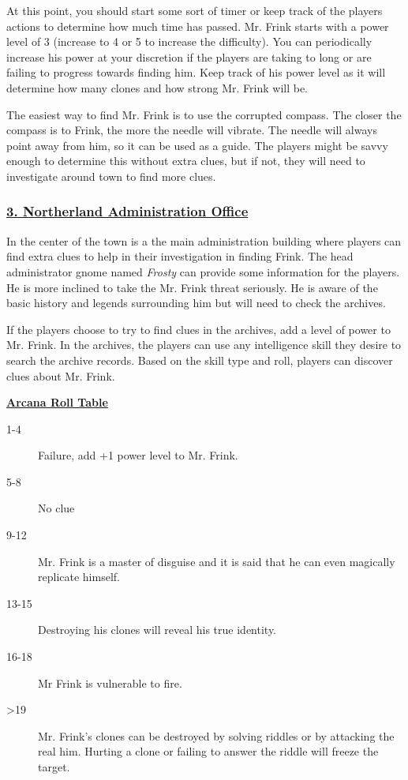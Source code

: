 \documentclass{article}
\begin{document}
\begin{multicols*}{2}
	At this point, you should start some sort of timer or keep track of the players actions to determine how much time has passed. Mr. Frink starts with a power level of 3 (increase to 4 or 5 to increase the difficulty). You can periodically increase his power at your discretion if the players are taking to long or are failing to progress towards finding him. Keep track of his power level as it will determine how many clones and how strong Mr. Frink will be.
	
	The easiest way to find Mr. Frink is to use the corrupted compass. The closer the compass is to Frink, the more the needle will vibrate. The needle will always point away from him, so it can be used as a guide. The players might be savvy enough to determine this without extra clues, but if not, they will need to investigate around town to find more clues.
	
	\subsubsection*{\underline{3. Northerland Administration Office}}
	
	In the center of the town is a the main administration building where players can find extra clues to help in their investigation in finding Frink. The head administrator gnome named \emph{Frosty} can provide some information for the players. He is more inclined to take the Mr. Frink threat seriously. He is aware of the basic history and legends surrounding him but will need to check the archives.
	
	If the players choose to try to find clues in the archives, add a level of power to Mr. Frink. In the archives, the players can use any intelligence skill they desire to search the archive records. Based on the skill type and roll, players can discover clues about Mr. Frink.
	
	\underline{\textbf{Arcana Roll Table}}
	\begin{description}
		\item[1-4] Failure, add +1 power level to Mr. Frink.
		\item[5-8] No clue
		\item[9-12] Mr. Frink is a master of disguise and it is said that he can even magically replicate himself.
		\item[13-15] Destroying his clones will reveal his true identity.
		\item[16-18] Mr Frink is vulnerable to fire.
		\item[>19] Mr. Frink's clones can be destroyed by solving riddles or by attacking the real him. Hurting a clone or failing to answer the riddle will freeze the target. 
	\end{description}


\end{multicols*}
\end{document}

